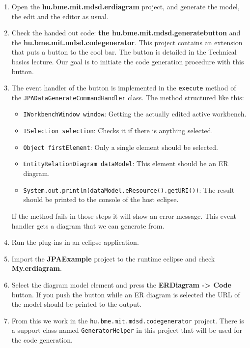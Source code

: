 \documentclass[]{report}
\begin{document}
\begin{enumerate}
\def\labelenumi{\arabic{enumi}.}
\item
  Open the \textbf{hu.bme.mit.mdsd.erdiagram} project, and generate the
  model, the edit and the editor as usual.
\item
  Check the handed out code: \textbf{the hu.bme.mit.mdsd.generatebutton}
  and the \textbf{hu.bme.mit.mdsd.codegenerator}. This project contains
  an extension that puts a button to the cool bar. The button is
  detailed in the Technical basics lecture. Our goal is to initiate the
  code generation procedure with this button.
\item
  The event handler of the button is implemented in the \texttt{execute}
  method of the \texttt{JPADataGenerateCommandHandler} class. The method
  structured like this:

  \begin{itemize}
  \itemsep1pt\parskip0pt
  \item
    \texttt{IWorkbenchWindow window}: Getting the actually edited active
    workbench.
  \item
    \texttt{ISelection selection}: Checks it if there is anything
    selected.
  \item
    \texttt{Object firstElement}: Only a single element should be
    selected.
  \item
    \texttt{EntityRelationDiagram dataModel}: This element should be an
    ER diagram.
  \item
    \texttt{System.out.println(dataModel.eResource().getURI())}: The
    result should be printed to the console of the host eclipse.
  \end{itemize}

  If the method fails in those steps it will show an error message. This
  event handler gets a diagram that we can generate from.
\item
  Run the plug-ins in an eclipse application.
\item
  Import the \textbf{JPAExample} project to the runtime eclipse and
  check \textbf{My.erdiagram}.
\item
  Select the diagram model element and press the \textbf{ERDiagram
  -\textgreater{} Code} button. If you push the button while an ER
  diagram is selected the URL of the model should be printed to the
  output.
\item
  From this we work in the \texttt{hu.bme.mit.mdsd.codegenerator}
  project. There is a support class named \texttt{GeneratorHelper} in
  this project that will be used for the code generation.


\end{enumerate}
\end{document}
